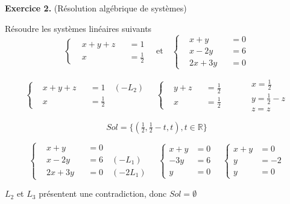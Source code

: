 \documentclass[a4paper, 10pt]{report}
\begin{document}
	\fancyhf{}
	\renewcommand{\headrule}
		{\rule{\textwidth}{0pt}}
	
	\noindent
	\textbf{Exercice 2.} (Résolution algébrique de systèmes)
	
	\indent Résoudre les systèmes linéaires suivants
	\[
		\left\{
		\begin{aligned}
			&x + y + z &&= 1\\
			&x &&= \frac{1}{2}
		\end{aligned}
		\right.
		\quad \text{et} \quad
		\left\{
		\begin{aligned}
			&x + y &&= 0\\
			&x - 2y &&= 6\\
			&2x + 3y &&= 0
		\end{aligned}
		\right.
	\]
	
	\colorbox{solution}
	{
		\begin{minipage}{0.9\textwidth}
			\[
				\left\{
				\begin{aligned}
					&x + y + z &&= 1 \quad (-L_2)\\
					&x &&= \frac{1}{2}
				\end{aligned}
				\right.
				\quad
				\left\{
				\begin{aligned}
					&y + z &&= \frac{1}{2}\\
					&x &&= \frac{1}{2}
				\end{aligned}
				\right.
				\qquad
				\left.
				\begin{aligned}
					&x = \tfrac{1}{2}\\
					&y = \tfrac{1}{2} - z\\
					&z = z
				\end{aligned}
				\right.
			\]
			
			\[
				Sol =\{(\tfrac{1}{2}, \tfrac{1}{2} - t, t),
					t \in \mathbb{R}\}
			\]
			
			\vspace{5mm}
			
			\[
			\left\{
			\begin{aligned}
				&x + y &&= 0\\
				&x - 2y &&= 6 \quad (-L_1)\\
				&2x + 3y &&= 0 \quad (-2L_1)
			\end{aligned}
			\right.
			\quad
			\left\{
			\begin{aligned}
				x + y &= 0\\
				- 3y &= 6\\
				y &= 0
			\end{aligned}
			\right.
			\quad
			\left\{
			\begin{aligned}
				x + y &= 0\\
				y &= -2\\
				y &= 0
			\end{aligned}
			\right.
			\]
			
			\begin{center}
				$L_2$ et $L_3$ présentent une contradiction, donc
				$Sol =\emptyset$
			\end{center}
		\end{minipage}
	}
	
\end{document}
